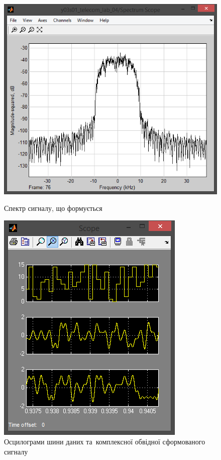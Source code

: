 \documentclass[
	a4paper,
	oneside,
	BCOR = 10mm,
	DIV = 12,
	12pt,
	headings = normal,
]{scrartcl}
\begin{document}
				\begin{figure}[!htbp]
					\begin{minipage}[t]{0.5\textwidth - 0.5em}
						\centering
						\includegraphics[height = 8\baselineskip]{../01-solution/rolloff-1p0-spectrum-scope.png}
						\caption{Спектр сигналу, що формується}
						\label{fig:rolloff-1p0-spectrum-scope}
					\end{minipage}\hspace{1em}%
					\begin{minipage}[t]{0.5\textwidth - 0.5em}
						\centering
						\includegraphics[height = 8\baselineskip]{../01-solution/rolloff-1p0-scope.png}
						\caption{Осцилограми шини даних та~комплексної обвідної сформованого сигналу}
						\label{fig:rolloff-1p0-scope}
					\end{minipage}%
				\end{figure}
\end{document}
